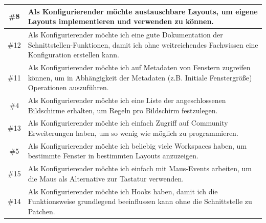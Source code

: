 \documentclass{article}
\begin{document}
\begin{tabularx}{\textwidth}{|c|X|}
	\#8  & Als Konfigurierender möchte austauschbare Layouts, um eigene Layouts implementieren und verwenden zu können.                                                        \\
	\hline
	\#12 & Als Konfigurierender möchte ich eine gute Dokumentation der Schnittstellen-Funktionen, damit ich ohne weitreichendes Fachwissen eine Konfiguration erstellen kann.  \\
	\hline
	\#11 & Als Konfigurierender möchte ich auf Metadaten von Fenstern zugreifen können, um in Abhängigkeit der Metadaten (z.B. Initiale Fenstergröße) Operationen auszuführen. \\
	\hline
	\#4  & Als Konfigurierender möchte ich eine Liste der angeschlossenen Bildschirme erhalten, um Regeln pro Bildschirm festzulegen.                                          \\
	\hline
	\#13 & Als Konfigurierender möchte ich einfach Zugriff auf Community Erweiterungen haben, um so wenig wie möglich zu programmieren.                                        \\
	\hline
	\#5  & Als Konfigurierender möchte ich beliebig viele Workspaces haben, um bestimmte Fenster in bestimmten Layouts anzuzeigen.                                             \\
	\hline
	\#15 & Als Konfigurierender möchte ich einfach mit Maus-Events arbeiten, um die Maus als Alternative zur Tastatur verwenden.                                               \\
	\hline
	\#14 & Als Konfigurierender möchte ich Hooks haben, damit ich die Funktionsweise grundlegend beeinflussen kann ohne die Schnittstelle zu Patchen.                          \\
	\hline
\end{tabularx}
\end{document}
